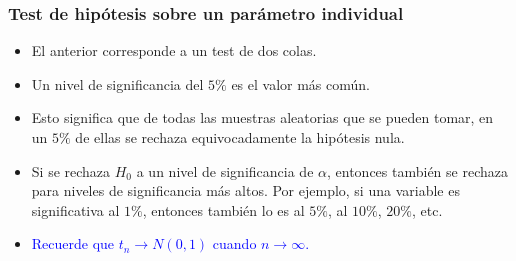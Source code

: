 \documentclass{beamer}
\begin{document}
\begin{frame}
\frametitle{Test de hipótesis sobre un parámetro individual}
\begin{itemize}
    \item El anterior corresponde a un test de dos colas.
    \item Un nivel de significancia del $5\%$ es el valor más común.
    \item Esto significa que de todas las muestras aleatorias que se pueden tomar, en un $5\%$ de ellas se rechaza equivocadamente la hipótesis nula.
    \item Si se rechaza $H_0$ a un nivel de significancia de $\alpha$, entonces también se rechaza para niveles de significancia más altos. Por ejemplo, si una variable es significativa al $1\%$, entonces también lo es al $5\%$, al $10\%$, $20\%$, etc.
    \item \textcolor{blue}{Recuerde que $t_n \rightarrow N(0, 1)$ cuando $n \rightarrow \infty$. }
\end{itemize}
\end{frame}




\end{document}
